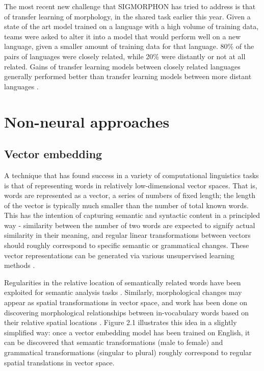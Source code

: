 The most recent new challenge that SIGMORPHON has tried to address is that of transfer learning of morphology, in the shared task earlier this year. Given a state of the art model trained on a language with a high volume of training data, teams were asked to alter it into a model that would perform well on a new language, given a smaller amount of training data for that language. 80\% of the pairs of languages were closely related, while 20\% were distantly or not at all related. Gains of transfer learning models between closely related languages generally performed better than transfer learning models between more distant languages \parencite{McCarthy2019}.

\section{Non-neural approaches}

\subsection{Vector embedding}

A technique that has found success in a variety of computational linguistics tasks is that of representing words in relatively low-dimensional vector spaces. That is, words are represented as a vector, a series of numbers of fixed length; the length of the vector is typically much smaller than the number of total known words. This has the intention of capturing semantic and syntactic content in a principled way - similarity between the number of two words are expected to signify actual similarity in their meaning, and regular linear transformations between vectors should roughly correspond to specific semantic or grammatical changes. These vector representations can be generated via various unsupervised learning methods \parencite{Bilmes2003} \parencite{Alexandrescu2006}.

Regularities in the relative location of semantically related words have been exploited for semantic analysis tasks \parencite{Alexandrescu2006}. Similarly, morphological changes may appear as spatial transformations in vector space, and work has been done on discovering morphological relationships between in-vocabulary words based on their relative spatial locations \parencite{Mikolov2013} \parencite{Soricut2015} \parencite{DosSantos2014}. Figure 2.1 illustrates this idea in a slightly simplified way: once a vector embedding model has been trained on English, it can be discovered that semantic transformations (male to female) and grammatical transformations (singular to plural) roughly correspond to regular spatial translations in vector space.

